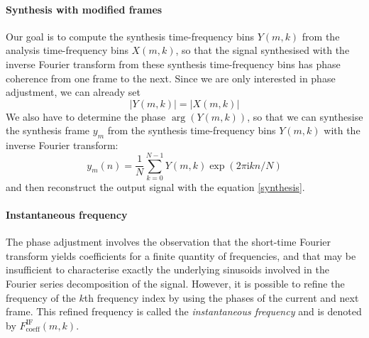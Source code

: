 \documentclass[letterpaper]{article}
\begin{document}
\paragraph{Synthesis with modified frames}
Our goal is to compute the synthesis time-frequency bins \(Y(m,k)\) from the
analysis time-frequency bins \(X(m,k)\), so that the signal synthesised with the
inverse Fourier transform from these synthesis time-frequency bins has phase
coherence from one frame to the next. Since we are only interested in phase
adjustment, we can already set
\begin{equation}
    |Y(m,k)| = |X(m,k)|
\end{equation}
We also have to determine the phase \(\arg(Y(m,k))\), so that we can synthesise
the synthesis frame \(y_m\) from the synthesis time-frequency bins \(Y(m,k)\)
with the inverse Fourier transform:
\begin{equation}
		y_m(n)=\frac{1}{N}\sum_{k=0}^{N-1}Y(m,k)\exp(2\pi\text{i}kn/N)
\end{equation}
and then reconstruct the output signal with the equation \eqref{synthesis}.

\paragraph{Instantaneous frequency}
The phase adjustment involves the observation that the short-time Fourier
transform yields coefficients for a finite quantity of frequencies, and that may
be insufficient to characterise exactly the underlying sinusoids involved in the
Fourier series decomposition of the signal. However, it is possible to refine
the frequency of the \(k\)th frequency index by using the phases of the current
and next frame. This refined frequency is called the \emph{instantaneous
frequency} and is denoted by \(F_{\text{coeff}}^{\text{IF}}(m,k)\).
\end{document}
